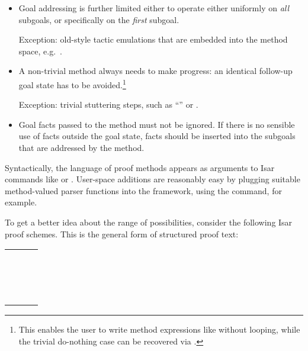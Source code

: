 \begin{isabellebody}
\begin{isamarkuptext}
  \begin{itemize}

  \item Goal addressing is further limited either to operate either
  uniformly on \emph{all} subgoals, or specifically on the
  \emph{first} subgoal.

  Exception: old-style tactic emulations that are embedded into the
  method space, e.g.\ \hyperlink{method.rule-tac}{\mbox{}}.

  \item A non-trivial method always needs to make progress: an
  identical follow-up goal state has to be avoided.\footnote{This
  enables the user to write method expressions like 
  without looping, while the trivial do-nothing case can be recovered
  via .}

  Exception: trivial stuttering steps, such as ``\hyperlink{method.-}{\mbox{\isa{{\isacharminus}}}}'' or
  \hyperlink{method.succeed}{\mbox{}}.

  \item Goal facts passed to the method must not be ignored.  If there
  is no sensible use of facts outside the goal state, facts should be
  inserted into the subgoals that are addressed by the method.

  \end{itemize}

  \medskip Syntactically, the language of proof methods appears as
  arguments to Isar commands like \hyperlink{command.by}{\mbox{}} or \hyperlink{command.apply}{\mbox{}}.
  User-space additions are reasonably easy by plugging suitable
  method-valued parser functions into the framework, using the
  \hyperlink{command.method-setup}{\mbox{}} command, for example.

  To get a better idea about the range of possibilities, consider the
  following Isar proof schemes.  This is the general form of
  structured proof text:

  \medskip
  \begin{tabular}{l}
  \hyperlink{command.from}{\mbox{\isa{\isacommand{from}}}}~\isa{facts\isactrlsub {\isadigit{1}}}~\hyperlink{command.have}{\mbox{\isa{\isacommand{have}}}}~\isa{props}~\hyperlink{command.using}{\mbox{\isa{\isacommand{using}}}}~\isa{facts\isactrlsub {\isadigit{2}}} \\
  \hyperlink{command.proof}{\mbox{\isa{\isacommand{proof}}}}~\isa{{\isacharparenleft}initial{\isacharunderscore}method{\isacharparenright}} \\
  \quad\isa{body} \\
  \hyperlink{command.qed}{\mbox{\isa{\isacommand{qed}}}}~\isa{{\isacharparenleft}terminal{\isacharunderscore}method{\isacharparenright}} \\
  \end{tabular}
  \medskip


\end{isamarkuptext}
\end{isabellebody}
